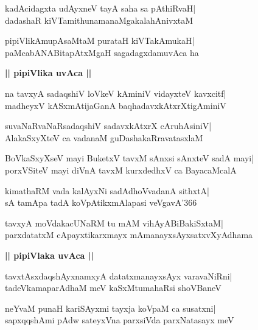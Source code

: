 \documentclass[twoside,12pt,openright]{book}
\newcounter{shloka}[chapter]
\def\uvaca#1{\centerline{{\large\textbf{#1}}}}
\begin{document}
\begin{shloka}%
kadAcidagxta udAyxneV tayA saha sa pAthiRvaH|\\
dadashaR kiVTamithunamanaMgakalahAnivxtaM
\end{shloka}

\begin{shloka}%
pipiVlikAmupAsaMtaM purataH kiVTakAmukaH|\\
paMcabANABitapAtxMgaH sagadagxdamuvAca ha
\end{shloka}

\uvaca{|| pipiVlika uvAca ||}
\begin{shloka}%
na tavxyA sadaqshiV loVkeV kAminiV vidayxteV kavxcitf|\\
madheyxV kASxmAtijaGanA baqhadavxkAtxrXtigAminiV
\end{shloka}

\begin{shloka}%
suvaNaRvaNaRsadaqshiV sadavxkAtxrX cAruhAsiniV|\\
AlakaSxyXteV ca vadanaM guDashakaRravatasxlaM
\end{shloka}

\begin{shloka}%
BoVkaSxyXseV mayi BuketxV tavxM sAnxsi sAnxteV sadA mayi|\\
porxVSiteV mayi diVnA tavxM kurxdedhxV ca BayacaMcalA
\end{shloka}

\begin{shloka}%
kimathaRM vada kalAyxNi sadAdhoVvadanA sithxtA|\\
sA tamApa tadA koVpAtikxmAlapasi veVgavA\char'366
\end{shloka}

\begin{shloka}%
tavxyA moVdakacUNaRM tu mAM vihAyABiBakiSxtaM|\\
parxdatatxM cApayxtikarxmayx mAmanayxsAyxsatxvXyAdhama
\end{shloka}

\uvaca{|| pipiVlaka uvAca ||}
\begin{shloka}%
tavxtAsxdaqshAyxnamxyA datatxmanayxsAyx varavaNiRni|\\
tadeVkamaparAdhaM meV kaSxMtumahaRsi shoVBaneV
\end{shloka}

\begin{shloka}%
neYvaM punaH kariSAyxmi tayxja koVpaM ca susatxni|\\
sapxqqshAmi pAdw sateyxVna parxsiVda parxNatasayx meV
\end{shloka}
\end{document}

